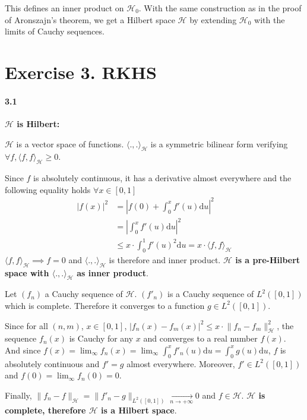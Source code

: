 \documentclass[10pt]{article}
\begin{document}
    This defines an inner product on $\mathcal{H}_0$. With the same 
    construction as in the proof of Aronszajn's theorem, we get a Hilbert space
    $\mathcal{H}$ by extending $\mathcal{H}_0$ with the limits of Cauchy 
    sequences.

    \section*{Exercise 3. RKHS}
    \paragraph{3.1} \textbf{ $\mathcal{H}$ is Hilbert: }
    
    $\mathcal{H}$ is a vector space of functions. $\langle ., .
    \rangle_\mathcal{H}$ is a symmetric bilinear form verifying $\forall f, 
    \langle f, f \rangle_\mathcal{H} \geq 0$.
    
    Since $f$ is absolutely continuous, it has a derivative almost everywhere 
    and the following equality holds $\forall x \in [0, 1]$
    \begin{align*}
        |f(x)|^2 &= \left| f(0) + \int_0^x f'(u)\text{d}u \right|^2\\
        &= \left| \int_0^x f'(u)\text{d}u \right|^2 \tag{$f(0) = 0$}\\ 
        &\leq x\cdot\int_0^1 f'(u)^2\text{d}u = x \cdot
        \langle f, f \rangle_\mathcal{H}
    \end{align*}
    $\langle f, f \rangle_\mathcal{H} \implies f = 0$ and $\langle ., .
    \rangle_\mathcal{H}$ is therefore and inner product. \textbf{$\mathcal{H}$
    is a pre-Hilbert space with $\langle ., . \rangle_\mathcal{H}$ as inner 
    product}.

    Let $(f_n)$ a Cauchy sequence of $\mathcal{H}$. $(f'_n)$ is a Cauchy 
    sequence of  $L^2([0,1])$ which is complete. Therefore it converges to a 
    function $g \in L^2([0,1])$.

    Since for all $(n,m)$, $x \in [0, 1]$, 
    $|f_n(x) - f_m(x)|^2\leq x \cdot \lVert f_n - f_m \rVert_\mathcal{H}^2$, the
    sequence $f_n(x)$ is Cauchy for any $x$ and converges to a real number 
    $f(x)$. 
    And since $f(x) = \lim_\infty f_n(x) = \lim_\infty \int_0^xf'_n(u)\text{d}u
    =  \int_0^x g(u)\text{d}u$, $f$ is absolutely continuous and $f' = g$ almost
    everywhere. Moreover, $f'\in L^2([0, 1])$ and $f(0) = \lim_\infty f_n(0) 
    = 0$. 
     
    Finally, $\lVert f_n - f \rVert_\mathcal{H} = \lVert f'_n - g 
    \rVert_{L^2([0,1])} \xrightarrow[n \rightarrow +\infty]{} 0$ and $f\in 
    \mathcal{H}$. \textbf{$\mathcal{H}$ is complete, therefore $\mathcal{H}$ is 
    a Hilbert space}.
    \vspace{1cm}
\end{document}
